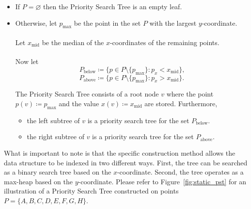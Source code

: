 \documentclass[twoside,11pt,openright]{report}
\begin{document}
\begin{itemize}
	\item If $P = \varnothing$ then the Priority Search Tree is an empty leaf.
	\item Otherwise, let $p_\text{max}$ be the point in the set $P$ with the largest $y$-coordinate. \\ \\
			Let $x_{\text{mid}}$ be the median of the $x$-coordinates of the remaining points. \\ \\ Now let
			$$ P_\text{below} \coloneqq \{p \in P \setminus \{p_\text{max} \} : p_x < x_\text{mid} \}\text{,}$$
			$$ P_\text{above} \coloneqq \{p \in P \setminus \{p_\text{max} \} : p_x > x_\text{mid} \}\text{.}$$
			
			The Priority Search Tree consists of a root node $v$ where the point \\
			$p(v) \coloneqq p_{\text{max}}$ and the value $x(v) \coloneqq x_{\text{mid}}$ are stored. Furthermore,
			\begin{itemize}[label=$\bullet$]
				\item the left subtree of $v$ is a priority search tree for the set $P_{\text{below}}$.
				\item the right subtree of $v$ is a priority search tree for the set $P_{\text{above}}$.
			\end{itemize}
\end{itemize}

What is important to note is that the specific construction method allows the data structure to be indexed in two different ways. First, the tree can be searched as a binary search tree based on the $x$-coordinate. Second, the tree operates as a max-heap based on the $y$-coordinate. Please refer to Figure~\ref{fig:static_pst} for an illustration of a Priority Search Tree constructed on points $P = \{A, B, C, D, E, F, G, H\}$.
\end{document}
